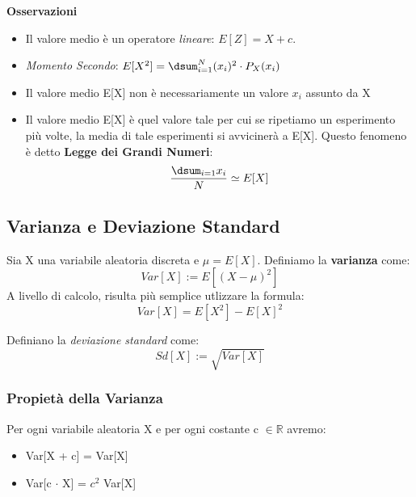 \noindent \textbf{Osservazioni}
\begin{itemize}
    \item Il valore medio è un operatore \textit{lineare}: $E[Z] = X + c$.
    \item \textit{Momento Secondo}: $E[X^2] = \dsum_{i=1}^N (x_i)^2 \cdot P_X(x_i)$
    \item Il valore medio E[X] non è necessariamente un valore $x_i$ assunto da X
    \item Il valore medio E[X] è quel valore tale per cui se ripetiamo un esperimento più volte, la media di tale esperimenti si avvicinerà a E[X]. Questo fenomeno è detto \textbf{Legge dei Grandi Numeri}: $$ \dfrac{\dsum_{i=1}x_i}{N} \simeq E[X]$$
\end{itemize}

\subsection{Varianza e Deviazione Standard}

Sia X una variabile aleatoria discreta e $\mu = E[X]$. Definiamo la \textbf{varianza} come: $$Var[X] := E[(X - \mu)^2]$$ A livello di calcolo, risulta più semplice utlizzare la formula: $$ Var[X] = E[X^2] - E[X]^2 $$

\noindent Definiano la \textit{deviazione standard} come: $$Sd[X] := \sqrt{Var[X]}$$



\subsubsection{Propietà della Varianza}

Per ogni variabile aleatoria X  e per ogni costante c $\in \mathbb{R}$ avremo: 
\begin{itemize}
    \item Var[X + c] = Var[X]
    \item Var[c $\cdot$ X] = $c^2$ Var[X]
\end{itemize}

